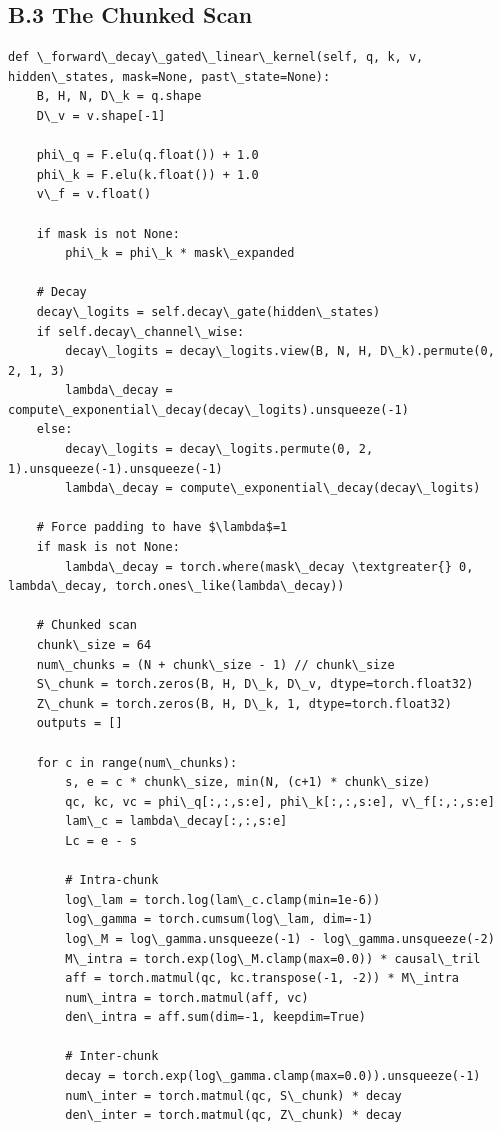 \subsection{B.3 The Chunked Scan}

\begin{lstlisting}
def \_forward\_decay\_gated\_linear\_kernel(self, q, k, v, hidden\_states, mask=None, past\_state=None):
    B, H, N, D\_k = q.shape
    D\_v = v.shape[-1]
    
    phi\_q = F.elu(q.float()) + 1.0
    phi\_k = F.elu(k.float()) + 1.0
    v\_f = v.float()
    
    if mask is not None:
        phi\_k = phi\_k * mask\_expanded
    
    # Decay
    decay\_logits = self.decay\_gate(hidden\_states)
    if self.decay\_channel\_wise:
        decay\_logits = decay\_logits.view(B, N, H, D\_k).permute(0, 2, 1, 3)
        lambda\_decay = compute\_exponential\_decay(decay\_logits).unsqueeze(-1)
    else:
        decay\_logits = decay\_logits.permute(0, 2, 1).unsqueeze(-1).unsqueeze(-1)
        lambda\_decay = compute\_exponential\_decay(decay\_logits)
    
    # Force padding to have $\lambda$=1
    if mask is not None:
        lambda\_decay = torch.where(mask\_decay \textgreater{} 0, lambda\_decay, torch.ones\_like(lambda\_decay))
    
    # Chunked scan
    chunk\_size = 64
    num\_chunks = (N + chunk\_size - 1) // chunk\_size
    S\_chunk = torch.zeros(B, H, D\_k, D\_v, dtype=torch.float32)
    Z\_chunk = torch.zeros(B, H, D\_k, 1, dtype=torch.float32)
    outputs = []
    
    for c in range(num\_chunks):
        s, e = c * chunk\_size, min(N, (c+1) * chunk\_size)
        qc, kc, vc = phi\_q[:,:,s:e], phi\_k[:,:,s:e], v\_f[:,:,s:e]
        lam\_c = lambda\_decay[:,:,s:e]
        Lc = e - s
        
        # Intra-chunk
        log\_lam = torch.log(lam\_c.clamp(min=1e-6))
        log\_gamma = torch.cumsum(log\_lam, dim=-1)
        log\_M = log\_gamma.unsqueeze(-1) - log\_gamma.unsqueeze(-2)
        M\_intra = torch.exp(log\_M.clamp(max=0.0)) * causal\_tril
        aff = torch.matmul(qc, kc.transpose(-1, -2)) * M\_intra
        num\_intra = torch.matmul(aff, vc)
        den\_intra = aff.sum(dim=-1, keepdim=True)
        
        # Inter-chunk
        decay = torch.exp(log\_gamma.clamp(max=0.0)).unsqueeze(-1)
        num\_inter = torch.matmul(qc, S\_chunk) * decay
        den\_inter = torch.matmul(qc, Z\_chunk) * decay
        

\end{lstlisting}
